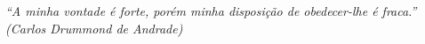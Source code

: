 %
%

\begin{epigrafe}

\textit{``A minha vontade é forte, porém minha disposição de obedecer-lhe é fraca.'' (Carlos Drummond de Andrade)}

\end{epigrafe}
